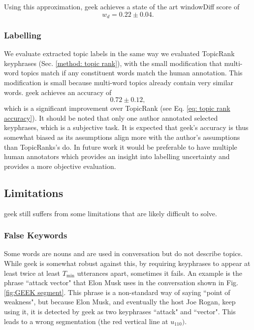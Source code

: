         Using this approximation, \gls{geek} achieves a state of the art windowDiff score of
        \begin{equation}
            w_d = 0.22 \pm 0.04.
        \end{equation}


    \subsubsection{Labelling}
        We evaluate extracted topic labels in the same way we evaluated TopicRank \glspl{keyphrase} (Sec. \ref{method: topic rank}), with the small modification that multi-word topics match if any constituent words match the human annotation. This modification is small because multi-word topics already contain very similar words. \gls{geek} achieves an accuracy of
        \begin{equation}
            0.72 \pm 0.12,
        \end{equation}
        which is a significant improvement over TopicRank (see Eq. \ref{eq: topic rank accuracy}). It should be noted that only one author annotated selected \glspl{keyphrase}, which is a subjective task. It is expected that \gls{geek}'s accuracy is thus somewhat biased as its assumptions align more with the author's assumptions than TopicRanks's do. In future work it would be preferable to have multiple human annotators which provides an insight into labelling uncertainty and provides a more objective evaluation.

    \subsection{Limitations}
    \gls{geek} still suffers from some limitations that are likely difficult to solve.

    \subsubsection{False Keywords}
        Some words are nouns and are used in conversation but do not describe topics. While \gls{geek} is somewhat robust against this, by requiring \glspl{keyphrase} to appear at least twice at least $T_{\text{min}}$ \glspl{utterance} apart, sometimes it fails. An example is the phrase ``attack vector" that Elon Musk uses in the conversation shown in Fig. \ref{fig:GEEK segment}. This phrase is a non-standard way of saying ``point of weakness", but because Elon Musk, and eventually the host Joe Rogan, keep using it, it is detected by \gls{geek} as two \glspl{keyphrase} ``attack" and ``vector". This leads to a wrong segmentation (the red vertical line at $u_{110})$.

